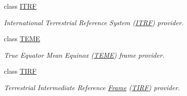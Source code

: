 \begin{DoxyCompactItemize}
class \hyperlink{classlibrary_1_1physics_1_1coord_1_1frame_1_1provider_1_1_i_t_r_f}{I\+T\+RF}
\begin{DoxyCompactList}\small\item\em International Terrestrial Reference System (\hyperlink{classlibrary_1_1physics_1_1coord_1_1frame_1_1provider_1_1_i_t_r_f}{I\+T\+RF}) provider. \end{DoxyCompactList}\item 
class \hyperlink{classlibrary_1_1physics_1_1coord_1_1frame_1_1provider_1_1_t_e_m_e}{T\+E\+ME}
\begin{DoxyCompactList}\small\item\em True Equator Mean Equinox (\hyperlink{classlibrary_1_1physics_1_1coord_1_1frame_1_1provider_1_1_t_e_m_e}{T\+E\+ME}) frame provider. \end{DoxyCompactList}\item 
class \hyperlink{classlibrary_1_1physics_1_1coord_1_1frame_1_1provider_1_1_t_i_r_f}{T\+I\+RF}
\begin{DoxyCompactList}\small\item\em Terrestrial Intermediate Reference \hyperlink{classlibrary_1_1physics_1_1coord_1_1_frame}{Frame} (\hyperlink{classlibrary_1_1physics_1_1coord_1_1frame_1_1provider_1_1_t_i_r_f}{T\+I\+RF}) provider. \end{DoxyCompactList}\end{DoxyCompactItemize}
